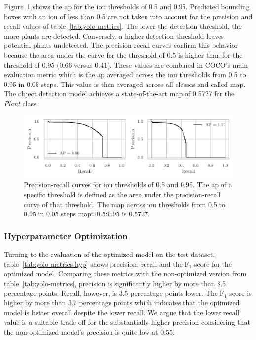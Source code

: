 \documentclass[draft,final]{vutinfth} %
\begin{document}
Figure~\ref{fig:yolo-ap} shows the \gls{ap} for the \gls{iou}
thresholds of \num{0.5} and \num{0.95}. Predicted bounding boxes with
an \gls{iou} of less than \num{0.5} are not taken into account for the
precision and recall values of table~\ref{tab:yolo-metrics}. The lower
the detection threshold, the more plants are detected. Conversely, a
higher detection threshold leaves potential plants undetected. The
precision-recall curves confirm this behavior because the area under
the curve for the threshold of \num{0.5} is higher than for the
threshold of \num{0.95} (\num{0.66} versus \num{0.41}). These values
are combined in COCO's \cite{lin2015} main evaluation metric which is
the \gls{ap} averaged across the \gls{iou} thresholds from \num{0.5}
to \num{0.95} in \num{0.05} steps. This value is then averaged across
all classes and called \gls{map}. The object detection model achieves
a state-of-the-art \gls{map} of \num{0.5727} for the \emph{Plant} class.

\begin{figure}
  \centering
  \includegraphics{graphics/APpt5-pt95.pdf}
  \caption[Object detection AP@0.5 and AP@0.95.]{Precision-recall
    curves for \gls{iou} thresholds of \num{0.5} and \num{0.95}. The
    \gls{ap} of a specific threshold is defined as the area under the
    precision-recall curve of that threshold. The \gls{map} across
    \gls{iou} thresholds from \num{0.5} to \num{0.95} in \num{0.05}
    steps \gls{map}@0.5:0.95 is \num{0.5727}.}
  \label{fig:yolo-ap}
\end{figure}

\subsubsection{Hyperparameter Optimization}
\label{sssec:yolo-hyp-opt}

Turning to the evaluation of the optimized model on the test dataset,
table~\ref{tab:yolo-metrics-hyp} shows precision, recall and the
$\mathrm{F}_1$-score for the optimized model. Comparing these metrics
with the non-optimized version from table~\ref{tab:yolo-metrics},
precision is significantly higher by more than \num{8.5} percentage
points. Recall, however, is \num{3.5} percentage points lower. The
$\mathrm{F}_1$-score is higher by more than \num{3.7} percentage
points which indicates that the optimized model is better overall
despite the lower recall. We argue that the lower recall value is a
suitable trade off for the substantially higher precision considering
that the non-optimized model's precision is quite low at \num{0.55}.
\end{document}
